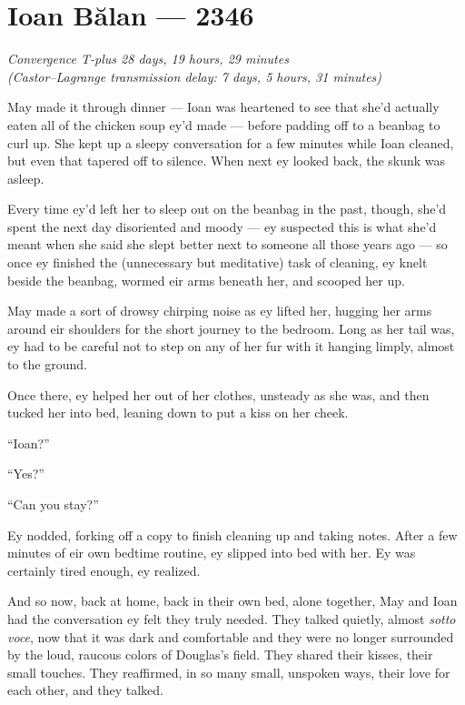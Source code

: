 \hypertarget{ioan-bux103lan-2346}{%
\chapter{Ioan Bălan — 2346}\label{ioan-bux103lan-2346}}

\begin{center}
\emph{Convergence T-plus 28 days, 19 hours, 29 minutes}\\
\emph{(Castor--Lagrange transmission delay: 7 days, 5 hours, 31 minutes)}
\end{center}

\noindent May made it through dinner — Ioan was heartened to see that she'd actually eaten all of the chicken soup ey'd made — before padding off to a beanbag to curl up. She kept up a sleepy conversation for a few minutes while Ioan cleaned, but even that tapered off to silence. When next ey looked back, the skunk was asleep.

Every time ey'd left her to sleep out on the beanbag in the past, though, she'd spent the next day disoriented and moody — ey suspected this is what she'd meant when she said she slept better next to someone all those years ago — so once ey finished the (unnecessary but meditative) task of cleaning, ey knelt beside the beanbag, wormed eir arms beneath her, and scooped her up.

May made a sort of drowsy chirping noise as ey lifted her, hugging her arms around eir shoulders for the short journey to the bedroom. Long as her tail was, ey had to be careful not to step on any of her fur with it hanging limply, almost to the ground.

Once there, ey helped her out of her clothes, unsteady as she was, and then tucked her into bed, leaning down to put a kiss on her cheek.

``Ioan?''

``Yes?''

``Can you stay?''

Ey nodded, forking off a copy to finish cleaning up and taking notes. After a few minutes of eir own bedtime routine, ey slipped into bed with her. Ey was certainly tired enough, ey realized.

And so now, back at home, back in their own bed, alone together, May and Ioan had the conversation ey felt they truly needed. They talked quietly, almost \emph{sotto voce}, now that it was dark and comfortable and they were no longer surrounded by the loud, raucous colors of Douglas's field. They shared their kisses, their small touches. They reaffirmed, in so many small, unspoken ways, their love for each other, and they talked.

